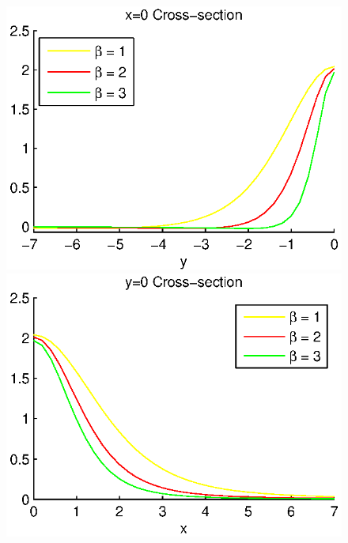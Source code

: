 \documentclass[preprint]{elsarticle}
\begin{document}
\begin{figure}[ht]
	\begin{minipage}[b]{0.5\linewidth}
		\raggedleft
		\includegraphics[width=\linewidth]{cross-sections/c=05beta=1__3x=0.eps}
	\end{minipage}	
	\begin{minipage}[b]{0.5\linewidth}
		\raggedright
		 \includegraphics[width=\linewidth]{cross-sections/c=05beta=1__3y=0.eps}
	\end{minipage}
	\begin{minipage}[b]{0.5\linewidth}
		\raggedleft

\end{minipage}
\end{figure}
\end{document}
